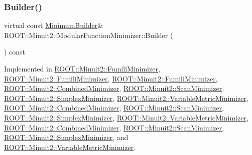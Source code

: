 \subsubsection{\texorpdfstring{Builder()}{Builder()}\hspace{0.1cm}{\footnotesize\ttfamily [1/3]}}
{\footnotesize\ttfamily virtual const \mbox{\hyperlink{classROOT_1_1Minuit2_1_1MinimumBuilder}{Minimum\+Builder}}\& R\+O\+O\+T\+::\+Minuit2\+::\+Modular\+Function\+Minimizer\+::\+Builder (\begin{DoxyParamCaption}{ }\end{DoxyParamCaption}) const\hspace{0.3cm}{\ttfamily [pure virtual]}}



Implemented in \mbox{\hyperlink{classROOT_1_1Minuit2_1_1FumiliMinimizer_a24d20e7cd4a335f60616fd7cafe0739c}{R\+O\+O\+T\+::\+Minuit2\+::\+Fumili\+Minimizer}}, \mbox{\hyperlink{classROOT_1_1Minuit2_1_1FumiliMinimizer_a24d20e7cd4a335f60616fd7cafe0739c}{R\+O\+O\+T\+::\+Minuit2\+::\+Fumili\+Minimizer}}, \mbox{\hyperlink{classROOT_1_1Minuit2_1_1FumiliMinimizer_a24d20e7cd4a335f60616fd7cafe0739c}{R\+O\+O\+T\+::\+Minuit2\+::\+Fumili\+Minimizer}}, \mbox{\hyperlink{classROOT_1_1Minuit2_1_1CombinedMinimizer_a73befc9c0bdfe8c9f09638505772c5ed}{R\+O\+O\+T\+::\+Minuit2\+::\+Combined\+Minimizer}}, \mbox{\hyperlink{classROOT_1_1Minuit2_1_1ScanMinimizer_a6ca4b63ec20ed8dd310e02d427ef05fa}{R\+O\+O\+T\+::\+Minuit2\+::\+Scan\+Minimizer}}, \mbox{\hyperlink{classROOT_1_1Minuit2_1_1SimplexMinimizer_a388494c3f9b45ce6c5d91decef737608}{R\+O\+O\+T\+::\+Minuit2\+::\+Simplex\+Minimizer}}, \mbox{\hyperlink{classROOT_1_1Minuit2_1_1VariableMetricMinimizer_aa31a52e431960a91acf0b9c2997b397b}{R\+O\+O\+T\+::\+Minuit2\+::\+Variable\+Metric\+Minimizer}}, \mbox{\hyperlink{classROOT_1_1Minuit2_1_1CombinedMinimizer_a73befc9c0bdfe8c9f09638505772c5ed}{R\+O\+O\+T\+::\+Minuit2\+::\+Combined\+Minimizer}}, \mbox{\hyperlink{classROOT_1_1Minuit2_1_1ScanMinimizer_a6ca4b63ec20ed8dd310e02d427ef05fa}{R\+O\+O\+T\+::\+Minuit2\+::\+Scan\+Minimizer}}, \mbox{\hyperlink{classROOT_1_1Minuit2_1_1SimplexMinimizer_a388494c3f9b45ce6c5d91decef737608}{R\+O\+O\+T\+::\+Minuit2\+::\+Simplex\+Minimizer}}, \mbox{\hyperlink{classROOT_1_1Minuit2_1_1VariableMetricMinimizer_aa31a52e431960a91acf0b9c2997b397b}{R\+O\+O\+T\+::\+Minuit2\+::\+Variable\+Metric\+Minimizer}}, \mbox{\hyperlink{classROOT_1_1Minuit2_1_1CombinedMinimizer_a73befc9c0bdfe8c9f09638505772c5ed}{R\+O\+O\+T\+::\+Minuit2\+::\+Combined\+Minimizer}}, \mbox{\hyperlink{classROOT_1_1Minuit2_1_1ScanMinimizer_a6ca4b63ec20ed8dd310e02d427ef05fa}{R\+O\+O\+T\+::\+Minuit2\+::\+Scan\+Minimizer}}, \mbox{\hyperlink{classROOT_1_1Minuit2_1_1SimplexMinimizer_a388494c3f9b45ce6c5d91decef737608}{R\+O\+O\+T\+::\+Minuit2\+::\+Simplex\+Minimizer}}, and \mbox{\hyperlink{classROOT_1_1Minuit2_1_1VariableMetricMinimizer_aa31a52e431960a91acf0b9c2997b397b}{R\+O\+O\+T\+::\+Minuit2\+::\+Variable\+Metric\+Minimizer}}.

